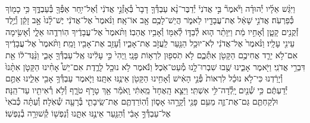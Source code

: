 \documentclass[twoside, openany, parskip=half, 11pt]{book}
\begin{document}
\begin{footnotesize}
\begin{multicols}{2}
\\
וַיִּגַּ֨שׁ אֵלָ֜יו יְ֯הוּדָ֗ה וַיֹּ֘אמֶר֘ בִּ֣י אֲדֹנִי֒ יְ֯דַבֶּר־נָ֨א עַבְדְּ֯ךָ֤ דָבָר֙ בְּ֯אָזְ֯נֵ֣י אֲדֹנִ֔י וְ֯אַל־יִ֥חַר אַפְּ֯ךָ֖ בְּ֯עַבְדֶּ֑ךָ כִּ֥י כָמ֖וֹךָ כְּ֯פַרְעֹֽה׃ אֲדֹנִ֣י שָׁאַ֔ל אֶת־עֲבָדָ֖יו לֵאמֹ֑ר הֲיֵשׁ־לָכֶ֥ם אָ֖ב אוֹ־אָֽח׃ וַנֹּ֨אמֶר֙ אֶל־אֲדֹנִ֔י יֶשׁ־לָ֨נוּ֙ אָ֣ב זָקֵ֔ן וְ֯יֶ֥לֶד זְ֯קֻנִ֖ים קָטָ֑ן וְ֯אָחִ֣יו מֵ֔ת וַיִּוָּתֵ֨ר ה֧וּא לְ֯בַדּ֛וֹ לְ֯אִמּ֖וֹ וְ֯אָבִ֥יו אֲהֵבֽוֹ׃  וַתֹּ֨אמֶר֙ אֶל־עֲבָדֶ֔יךָ הֽוֹרִדֻ֖הוּ אֵלָ֑י וְ֯אָשִׂ֥ימָה עֵינִ֖י עָלָֽיו׃ וַנֹּ֨אמֶר֙ אֶל־אֲדֹנִ֔י לֹֽא־יוּכַ֥ל הַנַּ֖עַר לַֽעֲזֹ֣ב אֶת־אָבִ֑יו וְ֯עָזַ֥ב אֶת־אָבִ֖יו וָמֵֽת׃ וַתֹּ֨אמֶר֙ אֶל־עֲבָדֶ֔יךָ אִם־לֹ֥א יֵרֵ֛ד אֲחִיכֶ֥ם הַקָּטֹ֖ן אִתְּ֯כֶ֑ם לֹ֥א תֹֽסִפ֖וּן לִרְא֥וֹת פָּנָֽי׃ וַֽיְהִי֙ כִּ֣י עָלִ֔ינוּ אֶֽל־עַבְדְּ֯ךָ֖ אָבִ֑י וַנַּ֨גֶּד־ל֔וֹ אֵ֖ת דִּבְרֵ֥י אֲדֹנִֽי׃  וַיֹּ֖אמֶר אָבִ֑ינוּ שֻׁ֖בוּ שִׁבְרוּ־לָ֥נוּ מְ֯עַט־אֹֽכֶל׃ וַנֹּ֕אמֶר לֹ֥א נוּכַ֖ל לָרֶ֑דֶת אִם־יֵשׁ֩ אָחִ֨ינוּ הַקָּטֹ֤ן אִתָּ֨נוּ֙ וְ֯יָרַ֔דְנוּ כִּי־לֹ֣א נוּכַ֗ל לִרְאוֹת֙ פְּ֯נֵ֣י הָאִ֔ישׁ וְ֯אָחִ֥ינוּ הַקָּטֹ֖ן אֵינֶ֥נּוּ אִתָּֽנוּ׃ וַיֹּ֛אמֶר עַבְדְּ֯ךָ֥ אָבִ֖י אֵלֵ֑ינוּ אַתֶּ֣ם יְ֯דַעְתֶּ֔ם כִּ֥י שְׁ֯נַ֖יִם יָֽלְ֯דָה־לִּ֥י אִשְׁתִּֽי׃ וַיֵּצֵ֤א הָֽאֶחָד֙ מֵֽאִתִּ֔י וָֽאֹמַ֕ר אַ֖ךְ טָרֹ֣ף טֹרָ֑ף וְ֯לֹ֥א רְ֯אִיתִ֖יו עַד־הֵֽנָּה׃ וּלְקַחְתֶּ֧ם גַּם־אֶת־זֶ֛ה מֵעִ֥ם פָּנַ֖י וְ֯קָרָ֣הוּ אָס֑וֹן וְ֯הֽוֹרַדְתֶּ֧ם אֶת־שֵֽׂיבָתִ֛י בְּ֯רָעָ֖ה שְׁ֯אֹֽלָה׃ וְ֯עַתָּ֗ה כְּ֯בֹאִי֙ אֶל־עַבְדְּ֯ךָ֣ אָבִ֔י וְ֯הַנַּ֖עַר אֵינֶ֣נּוּ אִתָּ֑נוּ וְ֯נַפְשׁ֖וֹ קְ֯שׁוּרָ֥ה בְ֯נַפְשֽׁוֹ׃


\end{multicols}
\end{footnotesize}
\end{document}
